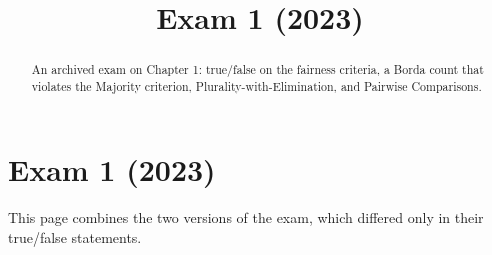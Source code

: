 \documentclass[12pt]{ximera}
\title{Exam 1 (2023)}
\begin{document}
\begin{abstract}
An archived exam on Chapter 1: true/false on the fairness criteria, a Borda count that violates the Majority criterion, Plurality-with-Elimination, and Pairwise Comparisons.
\end{abstract}
\maketitle

\section*{Exam 1 (2023)}

This page combines the two versions of the exam, which differed only in their
true/false statements.
\end{document}
